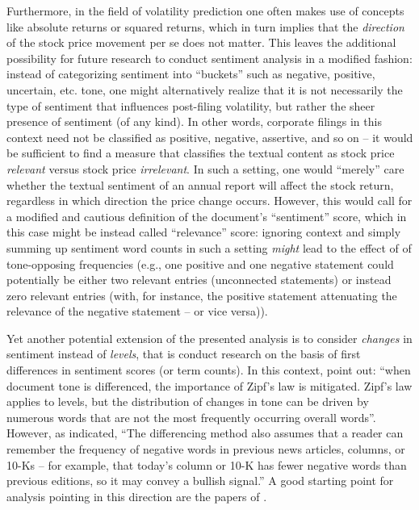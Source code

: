 Furthermore, in the field of volatility prediction one often makes use of concepts like absolute returns or squared returns, which in turn implies that the \emph{direction} of the stock price movement per se does not matter. This leaves the additional possibility for future research to conduct sentiment analysis in a modified fashion: instead of categorizing sentiment into \enquote{buckets} such as negative, positive, uncertain, etc. tone, one might alternatively realize that it is not necessarily the type of sentiment that influences post-filing volatility, but rather the sheer presence of sentiment (of any kind). In other words, corporate filings in this context need not be classified as positive, negative, assertive, and so on --  it would be sufficient to find a measure that classifies the textual content as stock price \textit{relevant} versus stock price \textit{irrelevant}. In such a setting, one would \enquote{merely} care whether the textual sentiment of an annual report will affect the stock return, regardless in which direction the price change occurs. However, this would call for a modified and cautious definition of the document's \enquote{sentiment} score, which in this case might be instead called \enquote{relevance} score: ignoring context and simply summing up sentiment word counts in such a setting \textit{might} lead to the effect of \textcite{cancelling out} of tone-opposing frequencies (e.g., one positive and one negative statement could potentially be either two relevant entries (unconnected statements) or instead zero relevant entries (with, for instance, the positive statement attenuating the relevance of the negative statement -- or vice versa)).

Yet another potential extension of the presented analysis is to consider \textit{changes} in sentiment instead of \textit{levels}, that is conduct research on the basis of first differences in sentiment scores (or term counts). In this context, \textcite[1220]{LM-meta-2016} point out: \enquote{when document tone is differenced, the importance of Zipf’s law is mitigated. Zipf’s law applies to levels, but the distribution of changes in tone can be driven by numerous words that are not the most frequently occurring overall words}. However, as \textcite{Loughran2011} indicated, \enquote{The differencing method also assumes that a reader can remember the frequency of negative words in previous news articles, columns, or 10-Ks -- for example, that today’s column or 10-K has fewer negative words than previous editions, so it may convey a bullish signal.} A good starting point for analysis pointing in this direction are the papers of \textcite{Loughran2011, Feldman_et_al_2010}. 

\clearpage